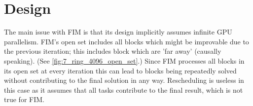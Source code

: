\documentclass[11pt]{article}       %
\begin{document}
\section{Design} \label{sec:design}

The main issue with FIM is that its design implicitly assumes infinite GPU parallelism. FIM's open set includes all blocks which might be improvable due to the previous iteration; this includes block which are 'far away' (causally speaking). (See \autoref{fig:7_ring_4096_open_set}.) Since FIM processes all blocks in its open set at every iteration this can lead to blocks being repeatedly solved without contributing to the final solution in any way. Rescheduling is useless in this case as it assumes that all tasks contribute to the final result, which is not true for FIM.
\end{document}
